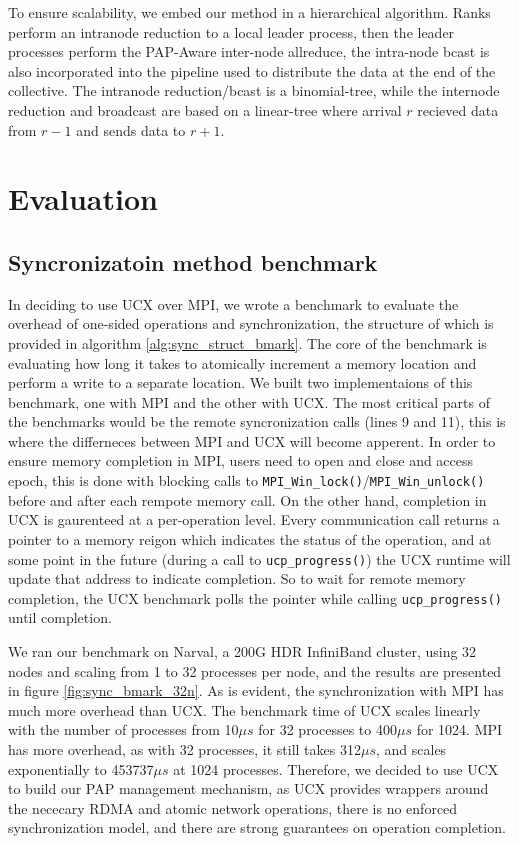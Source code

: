 To ensure scalability, we embed our method in a hierarchical algorithm. 
Ranks perform an intranode reduction to a local leader process, then the leader processes perform the PAP-Aware inter-node allreduce, the intra-node bcast is also incorporated into the pipeline used to distribute the data at the end of the collective. 
The intranode reduction/bcast is a binomial-tree, while the internode reduction and broadcast are based on a linear-tree where arrival $r$ recieved data from $r-1$ and sends data to $r+1$.

\section{Evaluation}
\subsection{Syncronizatoin method benchmark}
In deciding to use UCX over MPI, we wrote a benchmark to evaluate the overhead of one-sided operations and synchronization, the structure of which is provided in algorithm \ref{alg:sync_struct_bmark}.
The core of the benchmark is evaluating how long it takes to atomically increment a memory location and perform a write to a separate location.
We built two implementaions of this benchmark, one with MPI and the other with UCX. 
The most critical parts of the benchmarks would be the remote syncronization calls (lines 9 and 11), this is where the differneces between MPI and UCX will become apperent.  
In order to ensure memory completion in MPI, users need to open and close and access epoch, this is done with blocking calls to \texttt{MPI\_Win\_lock()}/\texttt{MPI\_Win\_unlock()} before and after each rempote memory call.
On the other hand, completion in UCX is gaurenteed at a per-operation level. 
Every communication call returns a pointer to a memory reigon which indicates the status of the operation, and at some point in the future (during a call to \texttt{ucp\_progress()}) the UCX runtime will update that address to indicate completion.
So to wait for remote memory completion, the UCX benchmark polls the pointer while calling \texttt{ucp\_progress()} until completion.

We ran our benchmark on Narval, a 200G HDR InfiniBand cluster, using 32 nodes and scaling from 1 to 32 processes per node, and the results are presented in figure \ref{fig:sync_bmark_32n}.
As is evident, the synchronization with MPI has much more overhead than UCX.
The benchmark time of UCX scales linearly with the number of processes from 10$\mu s$ for 32 processes to 400$\mu s$ for 1024.
MPI has more overhead, as with 32 processes, it still takes 312$\mu s$, and scales exponentially to 453737$\mu s$ at 1024 processes.
Therefore, we decided to use UCX to build our PAP management mechanism, as UCX provides wrappers around the nececary RDMA and atomic network operations, there is no enforced synchronization model, and there are strong guarantees on operation completion. 

